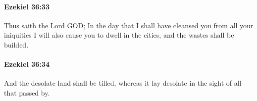 		\paragraph{Ezekiel 36:33} %
			\label{EZEKIEL-36-33}

			Thus saith the Lord GOD; In the day that I shall have cleansed you from all your iniquities I will also cause you to dwell in the cities, and the wastes shall be builded.


		\paragraph{Ezekiel 36:34} %
			\label{EZEKIEL-36-34}

			And the desolate land shall be tilled, whereas it lay desolate in the sight of all that passed by.


